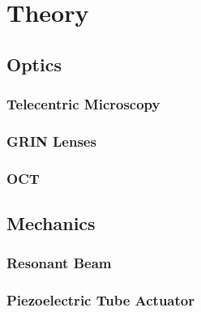 %
%
\chapter{Theory}
\label{Ch:Theory}	

\section{Optics}

\subsection{Telecentric Microscopy}

\subsection{GRIN Lenses}

\subsection{OCT}


\section{Mechanics}

\subsection{Resonant Beam}

\subsection{Piezoelectric Tube Actuator}